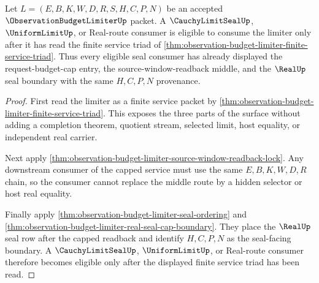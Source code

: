 \begin{theorem}
\label{thm:observation-budget-limiter-downstream-seal-eligibility}
Let $L=(E,B,K,W,D,R,S,H,C,P,N)$ be an accepted $\ObservationBudgetLimiterUp$ packet. A $\CauchyLimitSealUp$, $\UniformLimitUp$, or Real-route consumer is eligible to consume the limiter only after it has read the finite service triad of \autoref{thm:observation-budget-limiter-finite-service-triad}. Thus every eligible seal consumer has already displayed the request-budget-cap entry, the source-window-readback middle, and the $\RealUp$ seal boundary with the same $H,C,P,N$ provenance.
\end{theorem}
\begin{proof}
First read the limiter as a finite service packet by \autoref{thm:observation-budget-limiter-finite-service-triad}. This exposes the three parts of the surface without adding a completion theorem, quotient stream, selected limit, host equality, or independent real carrier.

Next apply \autoref{thm:observation-budget-limiter-source-window-readback-lock}. Any downstream consumer of the capped service must use the same $E,B,K,W,D,R$ chain, so the consumer cannot replace the middle route by a hidden selector or host real equality.

Finally apply \autoref{thm:observation-budget-limiter-seal-ordering} and \autoref{thm:observation-budget-limiter-real-seal-cap-boundary}. They place the $\RealUp$ seal row after the capped readback and identify $H,C,P,N$ as the seal-facing boundary. A $\CauchyLimitSealUp$, $\UniformLimitUp$, or Real-route consumer therefore becomes eligible only after the displayed finite service triad has been read.
\end{proof}

